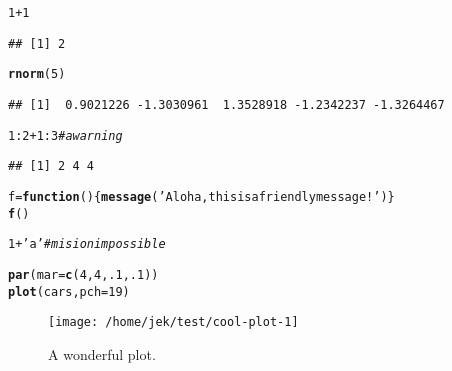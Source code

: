\documentclass[man]{apa7}
\makeatletter
\def\maxwidth{ %
  \ifdim\Gin@nat@width>\linewidth
    \linewidth
  \else
    \Gin@nat@width
  \fi
}
\newcommand{\hlnum}[1]{\textcolor[rgb]{0.686,0.059,0.569}{#1}}%
\newcommand{\hlstr}[1]{\textcolor[rgb]{0.192,0.494,0.8}{#1}}%
\newcommand{\hlcom}[1]{\textcolor[rgb]{0.678,0.584,0.686}{\textit{#1}}}%
\newcommand{\hlopt}[1]{\textcolor[rgb]{0,0,0}{#1}}%
\newcommand{\hlstd}[1]{\textcolor[rgb]{0.345,0.345,0.345}{#1}}%
\newcommand{\hlkwa}[1]{\textcolor[rgb]{0.161,0.373,0.58}{\textbf{#1}}}%
\newcommand{\hlkwb}[1]{\textcolor[rgb]{0.69,0.353,0.396}{#1}}%
\newcommand{\hlkwc}[1]{\textcolor[rgb]{0.333,0.667,0.333}{#1}}%
\newcommand{\hlkwd}[1]{\textcolor[rgb]{0.737,0.353,0.396}{\textbf{#1}}}%
\newenvironment{kframe}{%
 \def\at@end@of@kframe{}%
 \ifinner\ifhmode%
  \def\at@end@of@kframe{\end{minipage}}%
  \begin{minipage}{\columnwidth}%
 \fi\fi%
 \def\FrameCommand##1{\hskip\@totalleftmargin \hskip-\fboxsep
 \colorbox{shadecolor}{##1}\hskip-\fboxsep
     \hskip-\linewidth \hskip-\@totalleftmargin \hskip\columnwidth}%
 \MakeFramed {\advance\hsize-\width
   \@totalleftmargin\z@ \linewidth\hsize
   \@setminipage}}%
 {\par\unskip\endMakeFramed%
 \at@end@of@kframe}
\newenvironment{knitrout}{}{} %
\makeatother
\begin{document}
\begin{knitrout}
\color{fgcolor}\begin{kframe}
\begin{alltt}
\hlnum{1}\hlopt{+}\hlnum{1}
\end{alltt}
\begin{verbatim}
## [1] 2
\end{verbatim}
\begin{alltt}
\hlkwd{rnorm}\hlstd{(}\hlnum{5}\hlstd{)}
\end{alltt}
\begin{verbatim}
## [1]  0.9021226 -1.3030961  1.3528918 -1.2342237 -1.3264467
\end{verbatim}
\begin{alltt}
\hlnum{1}\hlopt{:}\hlnum{2}\hlopt{+}\hlnum{1}\hlopt{:}\hlnum{3} \hlcom{# a warning}
\end{alltt}

{\ttfamily\noindent\color{warningcolor}{\#\# Warning in 1:2 + 1:3: longer object length is not a multiple of shorter object length}}\begin{verbatim}
## [1] 2 4 4
\end{verbatim}
\begin{alltt}
\hlstd{f}\hlkwb{=}\hlkwa{function}\hlstd{()\{}\hlkwd{message}\hlstd{(}\hlstr{'Aloha, this is a friendly message!'}\hlstd{)\}}
\hlkwd{f}\hlstd{()}
\end{alltt}

{\ttfamily\noindent\itshape\color{messagecolor}{\#\# Aloha, this is a friendly message!}}\begin{alltt}
\hlnum{1}\hlopt{+}\hlstr{'a'} \hlcom{# mision impossible}
\end{alltt}

{\ttfamily\noindent\bfseries{}}\end{kframe}
\end{knitrout}

\begin{knitrout}
\color{fgcolor}\begin{kframe}
\begin{alltt}
\hlkwd{par}\hlstd{(}\hlkwc{mar}\hlstd{=}\hlkwd{c}\hlstd{(}\hlnum{4}\hlstd{,} \hlnum{4}\hlstd{,} \hlnum{.1}\hlstd{,} \hlnum{.1}\hlstd{))}
\hlkwd{plot}\hlstd{(cars,} \hlkwc{pch}\hlstd{=}\hlnum{19}\hlstd{)}
\end{alltt}
\end{kframe}\begin{figure}
\texttt{[image: /home/jek/test/cool-plot-1]} \caption[A wonderful plot]{A wonderful plot.}\label{fig:cool-plot}
\end{figure}

\end{knitrout}
\end{document}
